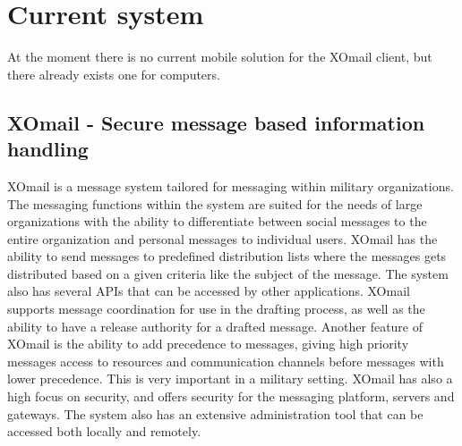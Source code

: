 \section{Current system}

At the moment there is no current mobile solution for the XOmail client, but there already exists one for computers.

\subsection{XOmail - Secure message based information handling}

XOmail is a message system tailored for messaging within military organizations. The messaging functions within the system are suited for the needs of large organizations with the ability to differentiate between social messages to the entire organization and personal messages to individual users. XOmail has the ability to send messages to predefined  distribution lists where the messages gets distributed based on a given criteria like the subject of the message. 
\newline
\newline
The system also has several APIs that can be accessed by other applications. XOmail supports message coordination for use in the drafting process, as well as the ability to have a release authority for a drafted message. Another feature of XOmail is the ability to add precedence to messages, giving high priority messages access to resources and communication channels before messages with lower precedence. This is very important in a military setting. 
\newline
\newline
XOmail has also a high focus on security, and offers security for the messaging platform, servers and gateways. The system also has an extensive administration tool that can be accessed both locally and remotely.